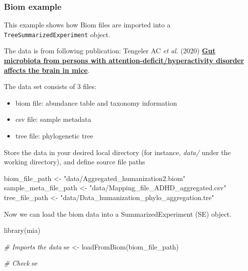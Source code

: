 \documentclass[
]{book}
\newenvironment{Shaded}{\begin{snugshade}}{\end{snugshade}}
\newcommand{\CommentTok}[1]{\textcolor[rgb]{0.56,0.35,0.01}{\textit{#1}}}
\newcommand{\FunctionTok}[1]{\textcolor[rgb]{0.00,0.00,0.00}{#1}}
\newcommand{\NormalTok}[1]{#1}
\newcommand{\OtherTok}[1]{\textcolor[rgb]{0.56,0.35,0.01}{#1}}
\newcommand{\StringTok}[1]{\textcolor[rgb]{0.31,0.60,0.02}{#1}}
\providecommand{\tightlist}{%
  \setlength{\itemsep}{0pt}\setlength{\parskip}{0pt}}
\begin{document}
\hypertarget{biom-example}{%
\subsubsection{Biom example}\label{biom-example}}

This example shows how Biom files are imported into a
\texttt{TreeSummarizedExperiment} object.

The data is from following publication:
Tengeler AC \emph{et al.} (2020) \href{https://doi.org/10.1186/s40168-020-00816-x}{\textbf{Gut microbiota from persons with
attention-deficit/hyperactivity disorder affects the brain in
mice}}.

The data set consists of 3 files:

\begin{itemize}
\tightlist
\item
  biom file: abundance table and taxonomy information
\item
  csv file: sample metadata
\item
  tree file: phylogenetic tree
\end{itemize}

Store the data in your desired local directory (for instance, \emph{data/} under the
working directory), and define source file paths

\begin{Shaded}
\begin{Highlighting}[]
\NormalTok{biom\_file\_path }\OtherTok{\textless{}{-}} \StringTok{"data/Aggregated\_humanization2.biom"}
\NormalTok{sample\_meta\_file\_path }\OtherTok{\textless{}{-}} \StringTok{"data/Mapping\_file\_ADHD\_aggregated.csv"}
\NormalTok{tree\_file\_path }\OtherTok{\textless{}{-}} \StringTok{"data/Data\_humanization\_phylo\_aggregation.tre"}
\end{Highlighting}
\end{Shaded}

Now we can load the biom data into a SummarizedExperiment (SE) object.

\begin{Shaded}
\begin{Highlighting}[]
\FunctionTok{library}\NormalTok{(mia)}

\CommentTok{\# Imports the data}
\NormalTok{se }\OtherTok{\textless{}{-}} \FunctionTok{loadFromBiom}\NormalTok{(biom\_file\_path)}

\CommentTok{\# Check}
\NormalTok{se}
\end{Highlighting}
\end{Shaded}
\end{document}

